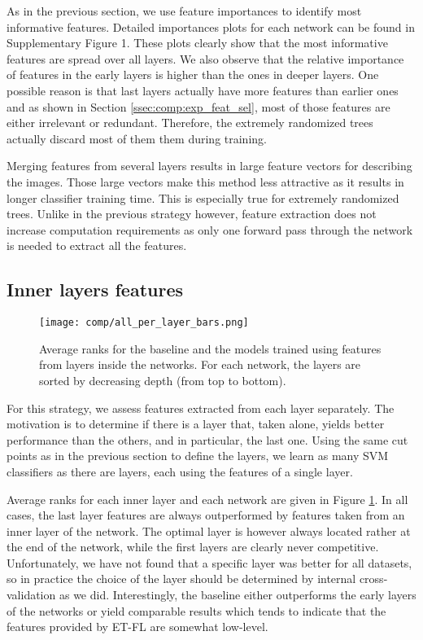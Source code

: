 As in the previous section, we use feature importances to identify most informative features. Detailed importances plots for each network can be found in Supplementary Figure 1. These plots clearly show that the most informative features are spread over all layers. We also observe that the relative importance of features in the early layers is higher than the ones in deeper layers. One possible reason is that last layers actually have more features than earlier ones and as shown in Section \ref{ssec:comp:exp_feat_sel}, most of those features are either irrelevant or redundant. Therefore, the extremely randomized trees actually discard most of them them during training. 

Merging features from several layers results in large feature vectors for describing the images. Those large vectors make this method less attractive as it results in longer classifier training time. This is especially true for extremely randomized trees. Unlike in the previous strategy however, feature extraction does not increase computation requirements as only one forward pass through the network is needed to extract all the features.



\subsection{Inner layers features}
\label{ssec:comp:exp_inner_layers}

\begin{figure}
     \center 
     \texttt{[image: comp/all\_per\_layer\_bars.png]}
     \caption{Average ranks for the baseline and the models trained using features from layers inside the networks. For each network, the layers are sorted by decreasing depth (from top to bottom).}
     \label{fig:comp:res_avg_ranks_per_layer}
 \end{figure}
 
For this strategy, we assess features extracted from each layer separately. The motivation is to determine if there is a layer that, taken alone, yields better performance than the others, and in particular, the last one. Using the same cut points as in the previous section to define the layers, we learn as many SVM classifiers as there are layers, each using the features of a single layer.

Average ranks for each inner layer and each network are given in Figure \ref{fig:comp:res_avg_ranks_per_layer}. In all cases, the last layer features are always outperformed by features taken from an inner layer of the network. The optimal layer is however always located rather at the end of the network, while the first layers are clearly never competitive. Unfortunately, we have not found that a specific layer was better for all datasets, so in practice the choice of the layer should be determined by internal cross-validation as we did. Interestingly, the baseline either outperforms the early layers of the networks or yield comparable results which tends to indicate that the features provided by ET-FL are somewhat low-level.

